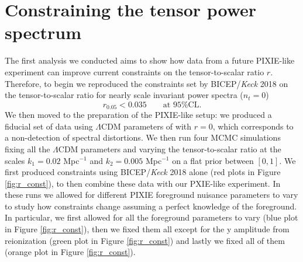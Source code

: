\section{Constraining the tensor power spectrum}
The first analysis we conducted aims to show how data from a future PIXIE-like experiment can improve current constraints on the tensor-to-scalar ratio $r$. Therefore, to begin we reproduced the constraints set by BICEP/\emph{Keck} 2018 on the tensor-to-scalar ratio for nearly scale invariant power spectra ($n_t=0$) 
$$r_{0.05}< 0.035\qquad \text{at 95\% CL.}$$
We then moved to the preparation of the PIXIE-like setup: we produced a fiducial set of data using $\Lambda$CDM parameters of \cite{planck2018results} with $r=0$, which corresponds to a non-detection of spectral distortions. We then run four MCMC simulations fixing all the $\Lambda$CDM parameters and varying the tensor-to-scalar ratio at the scales $k_1=0.02$ Mpc$^{-1}$ and $k_2=0.005$ Mpc$^{-1}$ on a flat prior between $[0,1]$. We first produced constraints using BICEP/\textit{Keck} 2018 alone (red plots in Figure \ref{fig:r_const}), to then combine these data with our PXIE-like experiment. In these runs we allowed for different PIXIE foreground nuisance parameters to vary to study how constraints change assuming a perfect knowledge of the foreground. In particular, we first allowed for all the foreground parameters to vary (blue plot in Figure \ref{fig:r_const}), then we fixed them all except for the y amplitude from reionization (green plot in Figure \ref{fig:r_const}) and lastly we fixed all of them (orange plot in Figure \ref{fig:r_const}). 

